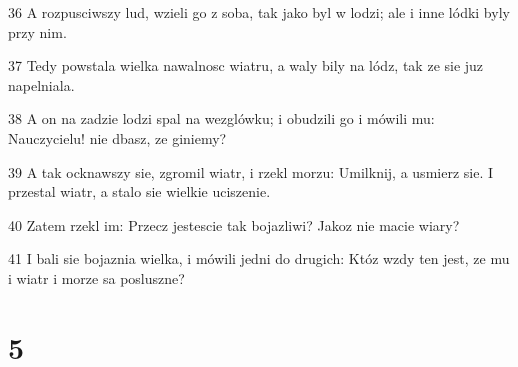 \par 36 A rozpusciwszy lud, wzieli go z soba, tak jako byl w lodzi; ale i inne lódki byly przy nim.
\par 37 Tedy powstala wielka nawalnosc wiatru, a waly bily na lódz, tak ze sie juz napelniala.
\par 38 A on na zadzie lodzi spal na wezglówku; i obudzili go i mówili mu: Nauczycielu! nie dbasz, ze giniemy?
\par 39 A tak ocknawszy sie, zgromil wiatr, i rzekl morzu: Umilknij, a usmierz sie. I przestal wiatr, a stalo sie wielkie uciszenie.
\par 40 Zatem rzekl im: Przecz jestescie tak bojazliwi? Jakoz nie macie wiary?
\par 41 I bali sie bojaznia wielka, i mówili jedni do drugich: Któz wzdy ten jest, ze mu i wiatr i morze sa posluszne?

\chapter{5}

